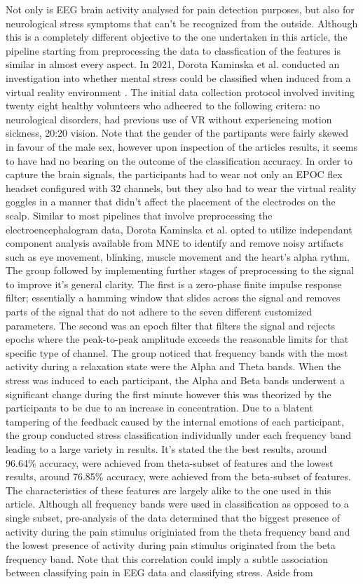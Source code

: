 \documentclass[11pt]{article}
\begin{document}
Not only is EEG brain activity analysed for pain detection purposes, but also for neurological stress symptoms that can't be recognized from the outside. Although this is a completely different objective to the one undertaken in this article, the pipeline starting from preprocessing the data to classfication of the features is similar in almost every aspect. In 2021, Dorota Kaminska et al. conducted an investigation into whether mental stress could be classified when induced from a virtual reality environment \cite{electronics10222840}. The initial data collection protocol involved inviting twenty eight healthy volunteers who adheered to the following critera: no neurological disorders, had previous use of VR without experiencing motion sickness, 20:20 vision. Note that the gender of the partipants were fairly skewed in favour of the male sex, however upon inspection of the articles results, it seems to have had no bearing on the outcome of the classification accuracy. In order to capture the brain signals, the participants had to wear not only an EPOC flex headset configured with 32 channels, but they also had to wear the virtual reality goggles in a manner that didn't affect the placement of the electrodes on the scalp. Similar to most pipelines that involve preprocessing the electroencephalogram data, Dorota Kaminska et al. opted to utilize independant component analysis available from MNE to identify and remove noisy artifacts such as eye movement, blinking, muscle movement and the heart's alpha rythm. The group followed by implementing further stages of preprocessing to the signal to improve it's general clarity. The first is a zero-phase finite impulse response filter; essentially a hamming window that slides across the signal and removes parts of the signal that do not adhere to the seven different customized parameters. The second was an epoch filter that filters the signal and rejects epochs where the peak-to-peak amplitude exceeds the reasonable limits for that specific type of channel. The group noticed that frequency bands with the most activity during a relaxation state were the Alpha and Theta bands. When the stress was induced to each participant, the Alpha and Beta bands underwent a significant change during the first minute however this was theorized by the participants to be due to an increase in concentration. Due to a blatent tampering of the feedback caused by the internal emotions of each participant, the group conducted stress classification individually under each frequency band leading to a large variety in results. It's stated the the best results, around 96.64\% accuracy, were achieved from theta-subset of features and the lowest results, around 76.85\% accuracy, were achieved from the beta-subset of features. The characteristics of these features are largely alike to the one used in this article. Although all frequency bands were used in classification as opposed to a single subset, pre-analysis of the data determined that the biggest presence of activity during the pain stimulus originiated from the theta frequency band and the lowest presence of activity during pain stimulus originated from the beta frequency band. Note that this correlation could imply a subtle association between classifying pain in EEG data and classifying stress. Aside from 
\end{document}

